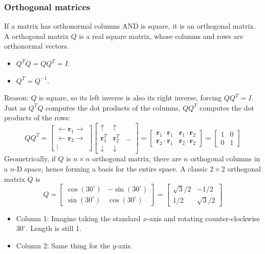 \documentclass[../linear-algebra.tex]{subfiles}
\begin{document}
\subsubsection{Orthogonal matrices}
If a matrix has orthonormal columns AND is square, it is an orthogonal matrix.\newline
A orthogonal matrix $Q$ is a real square matrix, whose columns and rows are orthonormal vectors.
\begin{itemize}
    \item $Q^T Q = Q Q^T = I$.
    \item $Q^T = Q^{-1}$.
\end{itemize}
Reason: $Q$ is square, so its left inverse is also its right inverse, forcing $QQ^T = I$. Just as $Q^TQ$ computes the dot products of the columns, $QQ^T$ computes the dot products of the rows:
$$QQ^T = \begin{bmatrix} \leftarrow \mathbf{r}_1 \rightarrow \\ \leftarrow \mathbf{r}_2 \rightarrow \\ \vdots \end{bmatrix} \begin{bmatrix} \uparrow & \uparrow & \\ \mathbf{r}_1^T & \mathbf{r}_2^T & \dots \\ \downarrow & \downarrow & \end{bmatrix} = \begin{bmatrix} \mathbf{r}_1 \cdot \mathbf{r}_1 & \mathbf{r}_1 \cdot \mathbf{r}_2 \\ \mathbf{r}_2 \cdot \mathbf{r}_1 & \mathbf{r}_2 \cdot \mathbf{r}_2 \end{bmatrix} = \begin{bmatrix} 1 & 0 \\ 0 & 1 \end{bmatrix}$$
Geometrically, if $Q$ is $n \times n$ orthogonal matrix, there are $n$ orthogonal columns in a $n$-D space, hence forming a basis for the entire space.\newline
A classic $2 \times 2$ orthogonal matrix $Q$ is
$$Q = \begin{bmatrix} \cos(30^\circ) & -\sin(30^\circ) \\ \sin(30^\circ) & \cos(30^\circ) \end{bmatrix} = \begin{bmatrix} \sqrt{3}/2 & -1/2 \\ 1/2 & \sqrt{3}/2 \end{bmatrix}$$
\begin{itemize}
    \item Column 1: Imagine taking the standard $x$-axis and rotating counter-clockwise $30^\circ$. Length is still 1.
    \item Column 2: Same thing for the $y$-axis.
\end{itemize}
\end{document}
